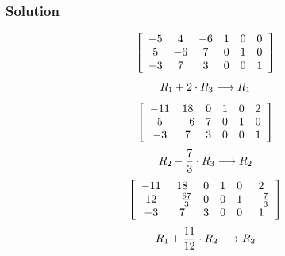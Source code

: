 \documentclass[xcolor=dvipsnames]{beamer}
\begin{document}
\begin{frame}
  \frametitle{Solution}
  \begin{equation}
    \label{eq:shuaphai}
    \left[
      \begin{array}{cccccc}
        -5 & 4  & -6 & 1 & 0 & 0 \\
         5 & -6 & 7  & 0 & 1 & 0 \\
        -3 & 7  & 3  & 0 & 0 & 1
      \end{array}\right]\notag
  \end{equation}
  \begin{equation}
    \label{eq:chokishi}
    R_{1}+2\cdot{}R_{3}\longrightarrow{}R_{1}\notag
  \end{equation}
  \begin{equation}
    \label{eq:ahkairoh}
    \left[
      \begin{array}{cccccc}
        -11 & 18  & 0 & 1 & 0 & 2 \\
         5 & -6 & 7  & 0 & 1 & 0 \\
        -3 & 7  & 3  & 0 & 0 & 1
      \end{array}\right]\notag
  \end{equation}
  \begin{equation}
    \label{eq:iejieche}
    R_{2}-\frac{7}{3}\cdot{}R_{3}\longrightarrow{}R_{2}\notag
  \end{equation}
  \begin{equation}
    \label{eq:jineivon}
    \left[
      \begin{array}{cccccc}
        -11 & 18  & 0 & 1 & 0 & 2 \\
         12 & -\frac{67}{3} & 0  & 0 & 1 & -\frac{7}{3} \\
        -3 & 7  & 3  & 0 & 0 & 1
      \end{array}\right]\notag
  \end{equation}
  \begin{equation}
    \label{eq:uamoofuk}
    R_{1}+\frac{11}{12}\cdot{}R_{2}\longrightarrow{}R_{2}\notag
  \end{equation}
\end{frame}
\end{document}
